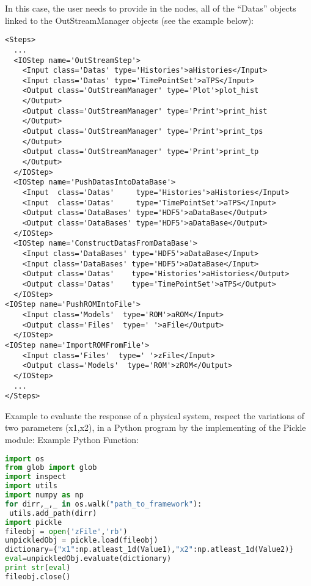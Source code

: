 In this case, the user needs to provide in the  nodes, all of the 
``Datas'' objects linked to the OutStreamManager objects (see the example 
below):
\begin{lstlisting}[style=XML,morekeywords={class}]
<Steps>
  ...
  <IOStep name='OutStreamStep'>
    <Input class='Datas' type='Histories'>aHistories</Input>
    <Input class='Datas' type='TimePointSet'>aTPS</Input>
    <Output class='OutStreamManager' type='Plot'>plot_hist
    </Output>
    <Output class='OutStreamManager' type='Print'>print_hist
    </Output>
    <Output class='OutStreamManager' type='Print'>print_tps
    </Output>
    <Output class='OutStreamManager' type='Print'>print_tp
    </Output>
  </IOStep>
  <IOStep name='PushDatasIntoDataBase'>
    <Input  class='Datas'     type='Histories'>aHistories</Input>
    <Input  class='Datas'     type='TimePointSet'>aTPS</Input>
    <Output class='DataBases' type='HDF5'>aDataBase</Output>
    <Output class='DataBases' type='HDF5'>aDataBase</Output>
  </IOStep>
  <IOStep name='ConstructDatasFromDataBase'>
    <Input class='DataBases' type='HDF5'>aDataBase</Input>
    <Input class='DataBases' type='HDF5'>aDataBase</Input>
    <Output class='Datas'    type='Histories'>aHistories</Output>
    <Output class='Datas'    type='TimePointSet'>aTPS</Output>
  </IOStep>
<IOStep name='PushROMIntoFile'>
    <Input class='Models'  type='ROM'>aROM</Input>
    <Output class='Files'  type=' '>aFile</Output>
  </IOStep>
<IOStep name='ImportROMFromFile'>
    <Input class='Files'  type=' '>zFile</Input>
    <Output class='Models'  type='ROM'>zROM</Output>
  </IOStep>
  ...
</Steps>
\end{lstlisting}
%
Example to evaluate the response of a physical system, respect the variations of two parameters (x1,x2),
 in a Python program by the implementing of the Pickle module: 
%
Example Python Function:
\begin{lstlisting}[language=python]
import os
from glob import glob
import inspect
import utils
import numpy as np
for dirr,_,_ in os.walk("path_to_framework"):
 utils.add_path(dirr)
import pickle
fileobj = open('zFile','rb')
unpickledObj = pickle.load(fileobj)
dictionary={"x1":np.atleast_1d(Value1),"x2":np.atleast_1d(Value2)}
eval=unpickledObj.evaluate(dictionary)
print str(eval)
fileobj.close()
\end{lstlisting}

